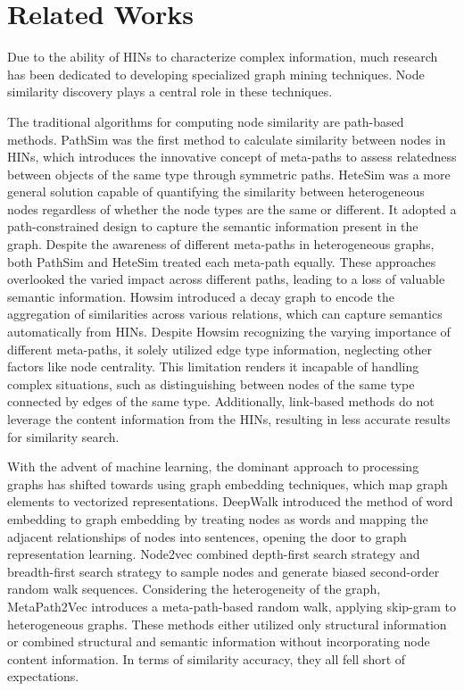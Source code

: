 \section{Related Works}
\label{sec2}

Due to the ability of HINs to characterize complex information, much research has been dedicated to developing specialized graph mining techniques. Node similarity discovery plays a central role in these techniques.

The traditional algorithms for computing node similarity are path-based methods. PathSim \cite{sun2011pathsim} was the first method to calculate similarity between nodes in HINs, which introduces the innovative concept of meta-paths to assess relatedness between objects of the same type through symmetric paths. HeteSim \cite{shi2014hetesim} was a more general solution capable of quantifying the similarity between heterogeneous nodes regardless of whether the node types are the same or different. It adopted a path-constrained design to capture the semantic information present in the graph. Despite the awareness of different meta-paths in heterogeneous graphs, both PathSim and HeteSim treated each meta-path equally. These approaches overlooked the varied impact across different paths, leading to a loss of valuable semantic information. Howsim \cite{wang2020howsim} introduced a decay graph to encode the aggregation of similarities across various relations, which can capture semantics automatically from HINs. Despite Howsim recognizing the varying importance of different meta-paths, it solely utilized edge type information, neglecting other factors like node centrality. This limitation renders it incapable of handling complex situations, such as distinguishing between nodes of the same type connected by edges of the same type. Additionally, link-based methods do not leverage the content information from the HINs, resulting in less accurate results for similarity search.

With the advent of machine learning, the dominant approach to processing graphs has shifted towards using graph embedding techniques, which map graph elements to vectorized representations. DeepWalk \cite{perozzi2014deepwalk} introduced the method of word embedding to graph embedding by treating nodes as words and mapping the adjacent relationships of nodes into sentences, opening the door to graph representation learning. Node2vec \cite{grover2016node2vec} combined depth-first search strategy and breadth-first search strategy to sample nodes and generate biased second-order random walk sequences. Considering the heterogeneity of the graph, MetaPath2Vec \cite{dong2017metapath2vec} introduces a meta-path-based random walk, applying skip-gram to heterogeneous graphs. These methods either utilized only structural information or combined structural and semantic information without incorporating node content information. In terms of similarity accuracy, they all fell short of expectations.

